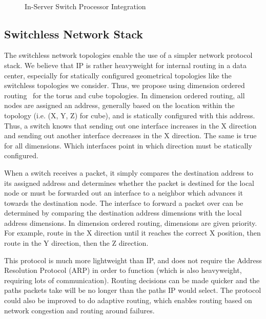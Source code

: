 \begin{figure}
    \centering
    ~
    \vspace{-0.07in}
    \caption{In-Server Switch Processor Integration}
    \label{fig:in_server_switch_design}
\end{figure}

\subsection{Switchless Network Stack}
\label{sec:arch:sec:net_stack}

The switchless network topologies enable the use of a simpler network protocol stack.  We believe that IP is rather heavyweight for internal routing in a data center, especially for statically configured geometrical topologies like the switchless topologies we consider.  Thus, we propose using dimension ordered routing~\cite{Ni:1993:SWRTDN} for the torus and cube topologies.  In dimension ordered routing, all nodes are assigned an address, generally based on the location within the topology (i.e. (X, Y, Z) for cube), and is statically configured with this address.  Thus, a switch knows that sending out one interface increases in the X direction and sending out another interface decreases in the X direction.  The same is true for all dimensions.  Which interfaces point in which direction must be statically configured.  

When a switch receives a packet, it simply compares the destination address to its assigned address and determines whether the packet is destined for the local node or must be forwarded out an interface to a neighbor which advances it towards the destination node.  The interface to forward a packet over can be determined by comparing the destination address dimensions with the local address dimensions.  In dimension ordered routing, dimensions are given priority.  For example, route in the X direction until it reaches the correct X position, then route in the Y direction, then the Z direction.

This protocol is much more lightweight than IP, and does not require the Address Resolution Protocol (ARP) in order to function (which is also heavyweight, requiring lots of communication).  Routing decisions can be made quicker and the paths packets take will be no longer than the paths IP would select.  The protocol could also be improved to do adaptive routing, which enables routing based on network congestion and routing around failures.  

